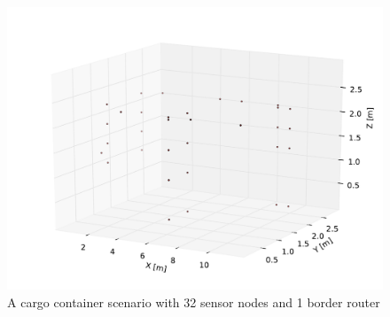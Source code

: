 \begin{figure}[htbp]
  \begin{center}
    \leavevmode
      \includegraphics[scale=0.45]
      {Pics/container.pdf}
   \caption{A cargo container scenario with 32 sensor nodes and 1 border router}
    \label{fig:container}
  \end{center}
\end{figure} 
 

